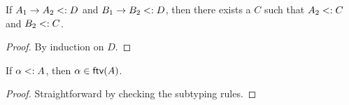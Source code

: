 \begin{lemma}
  \label{lemma:common-supertype}

  If $A_1 \to A_2 <: D$ and $B_1 \to B_2 <: D$,
  then there exists a $C$ such that $A_2 <: C$ and $B_2 <: C$.
\end{lemma}

\begin{proof}
  By induction on $D$.
\end{proof}

\begin{lemma}
  \label{lemma:subtype-ftv}

  If $\alpha <: A$, then $\alpha \in \textsf{ftv}(A)$.
\end{lemma}

\begin{proof}
  Straightforward by checking the subtyping rules.
\end{proof}

\algodissoundness*

